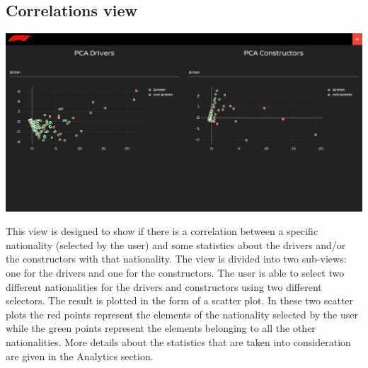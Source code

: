 \documentclass[11pt,twocolumn,letterpaper]{article}
\begin{document}
\subsection{Correlations view}
\begin{center}
	\centering
	\includegraphics[width=\columnwidth]{correlations}
\end{center}
This view is designed to show if there is a correlation between a specific nationality (selected by the user) and some statistics about the drivers and/or the constructors with that nationality. The view is divided into two sub-views: one for the drivers and one for the constructors. The user is able to select two different nationalities for the drivers and constructors using two different selectors. The result is plotted in the form of a scatter plot. In these two scatter plots the red points represent the elements of the nationality selected by the user while the green points represent the elements belonging to all the other nationalities. More details about the statistics that are taken into consideration are given in the Analytics section.
\end{document}
